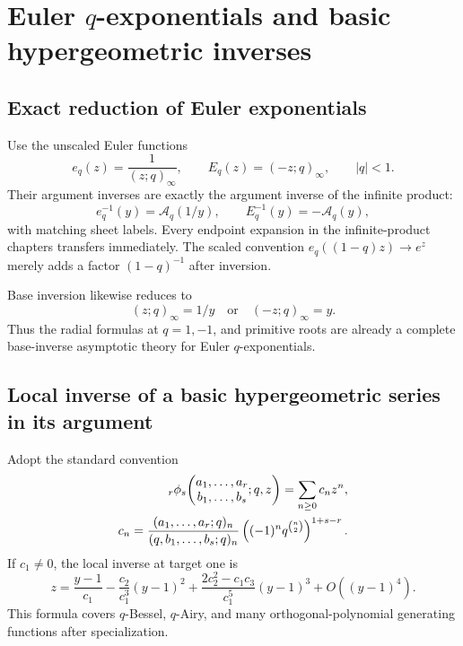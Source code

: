 \documentclass[11pt,letterpaper,oneside,openany]{book}
\theoremstyle{definition}
\theoremstyle{remark}
\newcommand{\Aq}{\mathcal A_q}
\begin{document}
\chapter{Euler \texorpdfstring{\(q\)}{q}-exponentials and basic hypergeometric inverses}

\section{Exact reduction of Euler exponentials}
Use the unscaled Euler functions
\[
 e_q(z)=\frac1{(z;q)_\infty},
 \qquad
 E_q(z)=(-z;q)_\infty,
 \qquad |q|<1.
\]
Their argument inverses are exactly the argument inverse of the infinite
product:
\begin{equation}\label{eq:qexp-argument-inverse}
 e_q^{-1}(y)=\Aq(1/y),
 \qquad
 E_q^{-1}(y)=-\Aq(y),
\end{equation}
with matching sheet labels.  Every endpoint expansion in the infinite-product
chapters transfers immediately.  The scaled convention
\(e_q((1-q)z)\to e^z\) merely adds a factor \((1-q)^{-1}\) after inversion.

Base inversion likewise reduces to
\[
 (z;q)_\infty=1/y
 \quad\text{or}\quad
 (-z;q)_\infty=y.
\]
Thus the radial formulas at \(q=1,-1\), and primitive roots are already a
complete base-inverse asymptotic theory for Euler \(q\)-exponentials.

\section{Local inverse of a basic hypergeometric series in its argument}
Adopt the standard convention
\begin{align}
 {}_r\phi_s\!\left(
 \begin{matrix}a_1,\ldots,a_r\\b_1,\ldots,b_s\end{matrix};q,z\right)
 =\sum_{n\ge0}c_nz^n,
 \label{eq:basic-hypergeometric-definition}\\
 c_n=
 \frac{(a_1,\ldots,a_r;q)_n}{(q,b_1,\ldots,b_s;q)_n}
 \left((-1)^nq^{\binom n2}\right)^{1+s-r}.
 \notag
\end{align}
If \(c_1\ne0\), the local inverse at target one is
\begin{equation}\label{eq:basic-hypergeometric-z-inverse}
 z=\frac{y-1}{c_1}-\frac{c_2}{c_1^3}(y-1)^2
 +\frac{2c_2^2-c_1c_3}{c_1^5}(y-1)^3+O((y-1)^4).
\end{equation}
This formula covers \(q\)-Bessel, \(q\)-Airy, and many orthogonal-polynomial
generating functions after specialization.
\end{document}
